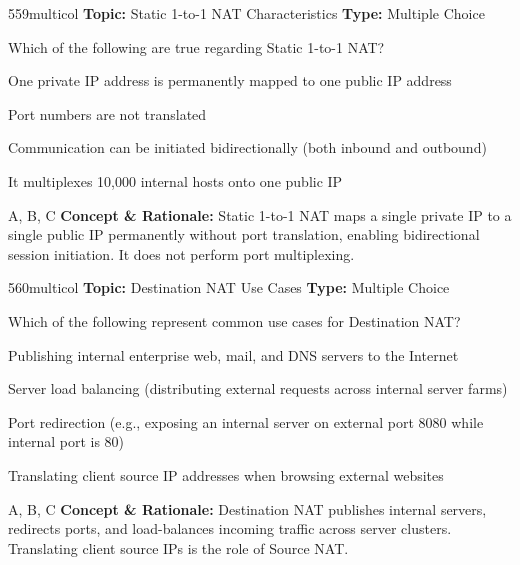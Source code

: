 \begin{qcard}{559}{multicol}
\textcolor{darkslate!75}{\small\textbf{Topic:} Static 1-to-1 NAT Characteristics \hfill \textbf{Type:} Multiple Choice}\vspace{0.4em}\par
Which of the following are true regarding Static 1-to-1 NAT?
\begin{qoptions}
\item One private IP address is permanently mapped to one public IP address
\item Port numbers are not translated
\item Communication can be initiated bidirectionally (both inbound and outbound)
\item It multiplexes 10,000 internal hosts onto one public IP
\end{qoptions}
\end{qcard}
\nopagebreak
\begin{explainbox}{A, B, C}
\textbf{Concept \& Rationale:} Static 1-to-1 NAT maps a single private IP to a single public IP permanently without port translation, enabling bidirectional session initiation. It does not perform port multiplexing.
\end{explainbox}

\begin{qcard}{560}{multicol}
\textcolor{darkslate!75}{\small\textbf{Topic:} Destination NAT Use Cases \hfill \textbf{Type:} Multiple Choice}\vspace{0.4em}\par
Which of the following represent common use cases for Destination NAT?
\begin{qoptions}
\item Publishing internal enterprise web, mail, and DNS servers to the Internet
\item Server load balancing (distributing external requests across internal server farms)
\item Port redirection (e.g., exposing an internal server on external port 8080 while internal port is 80)
\item Translating client source IP addresses when browsing external websites
\end{qoptions}
\end{qcard}
\nopagebreak
\begin{explainbox}{A, B, C}
\textbf{Concept \& Rationale:} Destination NAT publishes internal servers, redirects ports, and load-balances incoming traffic across server clusters. Translating client source IPs is the role of Source NAT.
\end{explainbox}

